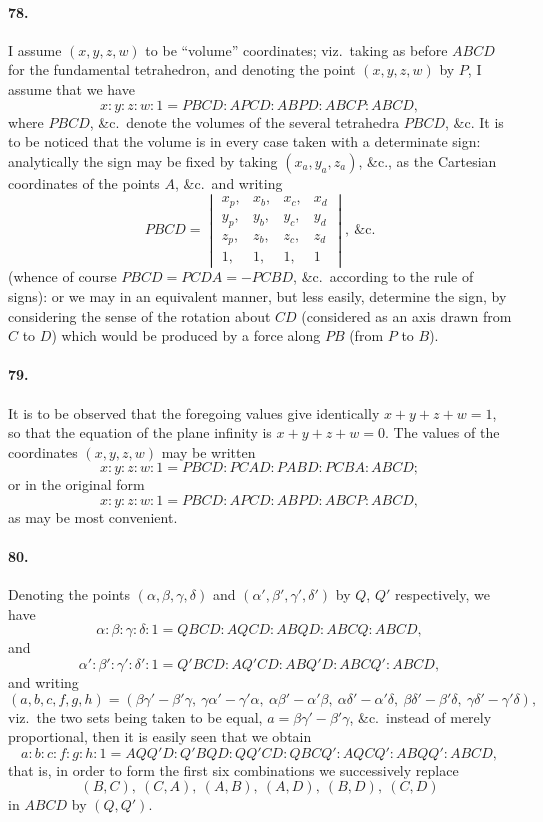 \documentclass[11pt,a4paper]{article}
\begin{document}
\paragraph{78.}
I assume $(x, y, z, w)$ to be ``volume'' coordinates; viz.\ taking as before
$ABCD$ for the fundamental tetrahedron, and denoting the point $(x, y, z, w)$ by $P$, I
assume that we have
\[
x : y : z : w : 1 = PBCD : APCD : ABPD : ABCP : ABCD,
\]
where $PBCD$, \&c.\ denote the volumes of the several tetrahedra $PBCD$, \&c. It is to
be noticed that the volume is in every case taken with a determinate sign: analytically
the sign may be fixed by taking $(x_a, y_a, z_a)$, \&c., as the Cartesian coordinates of
the points $A$, \&c.\ and writing
\[
PBCD =
\begin{vmatrix}
x_p, & x_b, & x_c, & x_d \\
y_p, & y_b, & y_c, & y_d \\
z_p, & z_b, & z_c, & z_d \\
1, & 1, & 1, & 1
\end{vmatrix},\ \&\text{c.}
\]
(whence of course $PBCD = PCDA = -PCBD$, \&c.\ according to the rule of signs): or
we may in an equivalent manner, but less easily, determine the sign, by considering
the sense of the rotation about $CD$ (considered as an axis drawn from $C$ to $D$) which
would be produced by a force along $PB$ (from $P$ to $B$).

\paragraph{79.}
It is to be observed that the foregoing values give identically
$x + y + z + w = 1$, so that the equation of the plane infinity is $x + y + z + w = 0$. The
values of the coordinates $(x, y, z, w)$ may be written
\[
x : y : z : w : 1 = PBCD : PCAD : PABD : PCBA : ABCD;
\]
or in the original form
\[
x : y : z : w : 1 = PBCD : APCD : ABPD : ABCP : ABCD,
\]
as may be most convenient.

\paragraph{80.}
Denoting the points $(\alpha, \beta, \gamma, \delta)$ and $(\alpha', \beta', \gamma', \delta')$
by $Q$, $Q'$ respectively, we have
\[
\alpha : \beta : \gamma : \delta : 1 = QBCD : AQCD : ABQD : ABCQ : ABCD,
\]
and
\[
\alpha' : \beta' : \gamma' : \delta' : 1 = Q'BCD : AQ'CD : ABQ'D : ABCQ' : ABCD,
\]
and writing
\[
(a,b,c,f,g,h) = (\beta\gamma' - \beta'\gamma,\ \gamma\alpha' - \gamma'\alpha,\
 \alpha\beta' - \alpha'\beta,\ \alpha\delta' - \alpha'\delta,\
 \beta\delta' - \beta'\delta,\ \gamma\delta' - \gamma'\delta),
\]
viz.\ the two sets being taken to be equal, $a = \beta\gamma' - \beta'\gamma$, \&c.\ instead of
merely proportional, then it is easily seen that we obtain
\[
a : b : c : f : g : h : 1
 = AQQ'D : Q'BQD : QQ'CD : QBCQ' : AQCQ' : ABQQ' : ABCD,
\]
that is, in order to form the first six combinations we successively replace
\[
(B, C),\ (C, A),\ (A, B),\ (A, D),\ (B, D),\ (C, D)
\]
in $ABCD$ by $(Q, Q')$.
\end{document}
